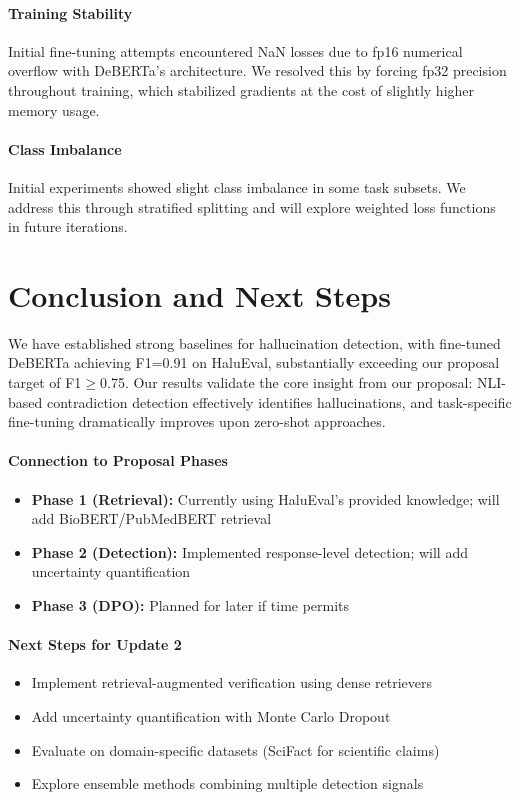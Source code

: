 \documentclass[11pt]{article}
\begin{document}
\paragraph{Training Stability} Initial fine-tuning attempts encountered NaN losses due to fp16 numerical overflow with DeBERTa's architecture. We resolved this by forcing fp32 precision throughout training, which stabilized gradients at the cost of slightly higher memory usage.

\paragraph{Class Imbalance} Initial experiments showed slight class imbalance in some task subsets. We address this through stratified splitting and will explore weighted loss functions in future iterations.

\section{Conclusion and Next Steps}

We have established strong baselines for hallucination detection, with fine-tuned DeBERTa achieving F1=0.91 on HaluEval, substantially exceeding our proposal target of F1$\geq$0.75. Our results validate the core insight from our proposal: NLI-based contradiction detection effectively identifies hallucinations, and task-specific fine-tuning dramatically improves upon zero-shot approaches.

\paragraph{Connection to Proposal Phases}

\begin{itemize}
    \item \textbf{Phase 1 (Retrieval):} Currently using HaluEval's provided knowledge; will add BioBERT/PubMedBERT retrieval
    \item \textbf{Phase 2 (Detection):} Implemented response-level detection; will add uncertainty quantification
    \item \textbf{Phase 3 (DPO):} Planned for later if time permits
\end{itemize}

\paragraph{Next Steps for Update 2}
\begin{itemize}
    \item Implement retrieval-augmented verification using dense retrievers
    \item Add uncertainty quantification with Monte Carlo Dropout
    \item Evaluate on domain-specific datasets (SciFact for scientific claims)
    \item Explore ensemble methods combining multiple detection signals
\end{itemize}
\end{document}
